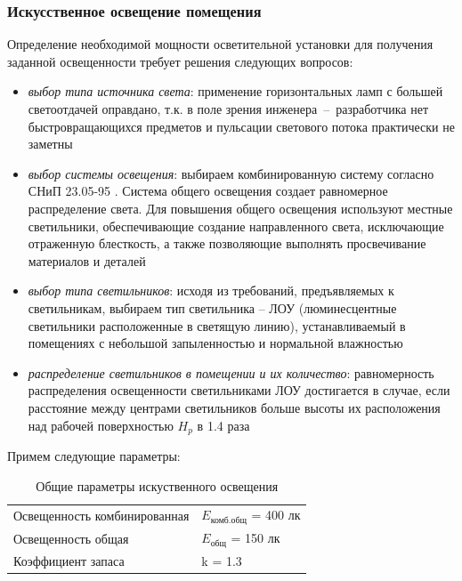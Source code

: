 \subsubsection{Искусственное освещение помещения}

Определение необходимой мощности осветительной установки для получения заданной
освещенности требует решения следующих вопросов:

\begin{itemize}
    \item \textit{выбор типа источника света}: применение горизонтальных ламп с
    большей светоотдачей оправдано, т.к. в поле зрения инженера~--~разработчика
    нет быстровращающихся предметов и пульсации светового потока практически не
    заметны

    \item \textit{выбор системы освещения}: выбираем комбинированную систему
    согласно СНиП 23.05-95 \cite{ecology_snip_23_05_95}. Система общего освещения
    создает равномерное распределение света. Для повышения общего освещения
    используют местные светильники, обеспечивающие создание направленного света,
    исключающие отраженную блесткость, а также позволяющие выполнять просвечивание
    материалов и деталей

    \item \textit{выбор типа светильников}: исходя из требований, предъявляемых
    к светильникам, выбираем тип светильника – ЛОУ (люминесцентные светильники
    расположенные в светящую линию), устанавливаемый в помещениях с небольшой
    запыленностью и нормальной влажностью

    \item \textit{распределение светильников в помещении и их количество}:
    равномерность распределения освещенности светильниками ЛОУ достигается в случае,
    если расстояние между центрами светильников больше высоты их расположения над
    рабочей поверхностью $H_p$ в 1.4 раза
\end{itemize}

Примем следующие параметры:
\begin{table}[h!]
    \centering
    \begin{tabular}{l|l}
        \hline
        Освещенность комбинированная    & $E_\text{комб.общ}$ = 400 лк  \\
        Освещенность общая              & $E_\text{общ}$ = 150 лк       \\
        Коэффициент запаса              & k = 1.3                       \\
        \hline
    \end{tabular}
    \caption{Общие параметры искуственного освещения}
    \label{artificial_lighting_parameters}
\end{table}

